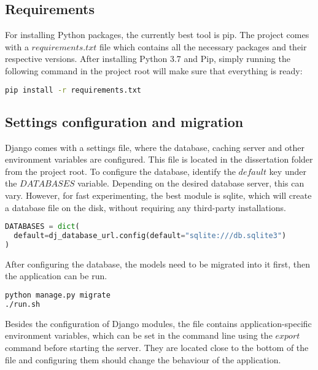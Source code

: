 \subsection{Requirements}
\label{subsec:app_install_requirements}

For installing Python packages, the currently best tool is pip. The project comes with a $requirements.txt$ file which contains all the necessary packages and their respective versions. After installing Python 3.7 and Pip, simply running the following command in the project root will make sure that everything is ready:

\begin{lstlisting}[language=Bash]
pip install -r requirements.txt
\end{lstlisting}

\subsection{Settings configuration and migration}
\label{subsec:app_install_database}

Django comes with a settings file, where the database, caching server and other environment variables are configured. This file is located in the dissertation folder from the project root. To configure the database, identify the $default$ key under the $DATABASES$ variable. Depending on the desired database server, this can vary. However, for fast experimenting, the best module is sqlite, which will create a database file on the disk, without requiring any third-party installations.

\begin{lstlisting}[language=Python]
DATABASES = dict(
  default=dj_database_url.config(default="sqlite:///db.sqlite3")
)
\end{lstlisting}

After configuring the database, the models need to be migrated into it first, then the application can be run.

\begin{lstlisting}[language=Bash]
python manage.py migrate
./run.sh
\end{lstlisting}

Besides the configuration of Django modules, the file contains application-specific environment variables, which can be set in the command line using the $export$ command before starting the server. They are located close to the bottom of the file and configuring them should change the behaviour of the application.

